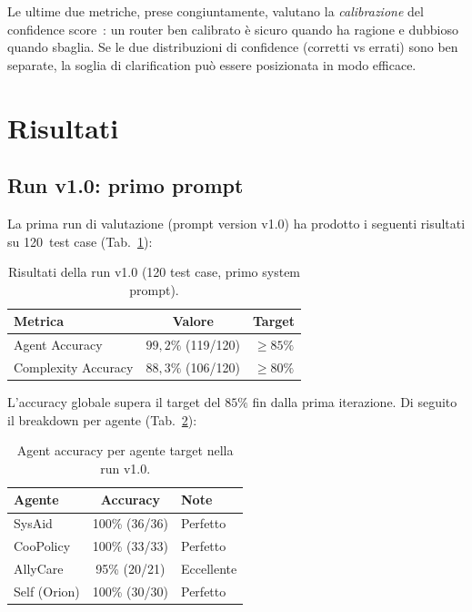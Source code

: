 Le ultime due metriche, prese congiuntamente, valutano la \emph{calibrazione} del confidence score~\cite{kadavath2022knowsknows}: 
un router ben calibrato è sicuro quando ha ragione e dubbioso quando sbaglia. 
Se le due distribuzioni di confidence (corretti vs errati) sono ben separate, la soglia di clarification può essere posizionata in modo efficace.

\section{Risultati}
\label{sec:eval-risultati}

\subsection{Run v1.0: primo prompt}
\label{subsec:eval-v10}

La prima run di valutazione (prompt version v1.0) ha prodotto i seguenti risultati su 120~test case (Tab.~\ref{tab:eval-v10}):

\begin{table}[htbp]
  \centering
  \caption[Risultati della run v1.0]{Risultati della run v1.0 (120 test case, primo system prompt).}
  \label{tab:eval-v10}
  \begin{tabular}{lcc}
    \toprule
    \textbf{Metrica}             & \textbf{Valore}  & \textbf{Target} \\
    \midrule
    Agent Accuracy               & $99{,}2\%$ (119/120) & $\geq 85\%$ \\
    Complexity Accuracy          & $88{,}3\%$ (106/120) & $\geq 80\%$ \\
    \bottomrule
  \end{tabular}
\end{table}

L'accuracy globale supera il target del $85\%$ fin dalla prima iterazione. Di seguito il breakdown per agente (Tab.~\ref{tab:eval-v10-breakdown}):

\begin{table}[htbp]
  \centering
  \caption[Breakdown per agente --- v1.0]{Agent accuracy per agente target nella run v1.0.}
  \label{tab:eval-v10-breakdown}
  \begin{tabular}{lcl}
    \toprule
    \textbf{Agente}   & \textbf{Accuracy}     & \textbf{Note} \\
    \midrule
    SysAid            & 100\% (36/36)         & Perfetto \\
    CooPolicy         & 100\% (33/33)         & Perfetto \\
    AllyCare          & 95\% (20/21)          & Eccellente \\
    Self (Orion)      & 100\% (30/30)         & Perfetto \\
    \bottomrule
  \end{tabular}
\end{table}

